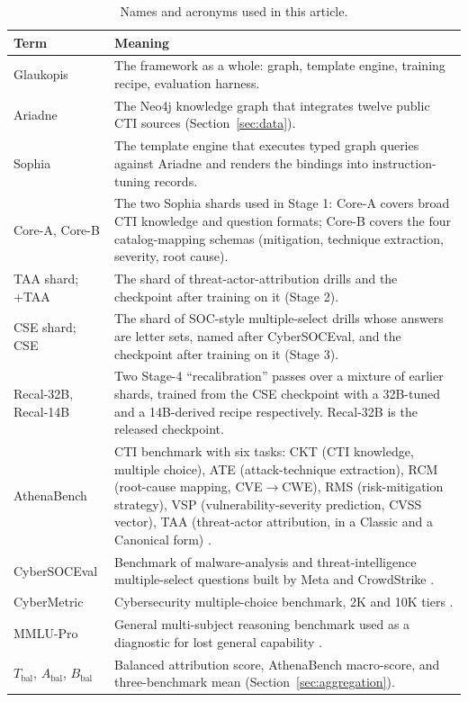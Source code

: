 \documentclass[twocolumn]{svjour3}
\newcommand{\Abal}{A_{\mathrm{bal}}}
\newcommand{\Bbal}{B_{\mathrm{bal}}}
\newcommand{\Tbal}{T_{\mathrm{bal}}}
\begin{document}
\begin{table}
\centering\footnotesize
\caption{Names and acronyms used in this article.}\label{tab:glossary}
\begin{tabularx}{\textwidth}{@{}P{3.2cm}X@{}}
\toprule Term & Meaning \\\midrule
Glaukopis & The framework as a whole: graph, template engine, training recipe, evaluation harness. \\
Ariadne & The Neo4j knowledge graph that integrates twelve public CTI sources (Section~\ref{sec:data}). \\
Sophia & The template engine that executes typed graph queries against Ariadne and renders the bindings into instruction-tuning records. \\
Core-A, Core-B & The two Sophia shards used in Stage 1: Core-A covers broad CTI knowledge and question formats; Core-B covers the four catalog-mapping schemas (mitigation, technique extraction, severity, root cause). \\
TAA shard; +TAA & The shard of threat-actor-attribution drills and the checkpoint after training on it (Stage 2). \\
CSE shard; CSE & The shard of SOC-style multiple-select drills whose answers are letter sets, named after CyberSOCEval, and the checkpoint after training on it (Stage 3). \\
Recal-32B, Recal-14B & Two Stage-4 ``recalibration'' passes over a mixture of earlier shards, trained from the CSE checkpoint with a 32B-tuned and a 14B-derived recipe respectively. Recal-32B is the released checkpoint. \\
AthenaBench & CTI benchmark with six tasks: CKT (CTI knowledge, multiple choice), ATE (attack-technique extraction), RCM (root-cause mapping, CVE$\to$CWE), RMS (risk-mitigation strategy), VSP (vulnerability-severity prediction, CVSS vector), TAA (threat-actor attribution, in a Classic and a Canonical form) \cite{alam2025athenabench}. \\
CyberSOCEval & Benchmark of malware-analysis and threat-intelligence multiple-select questions built by Meta and CrowdStrike \cite{deason2025cybersoceval}. \\
CyberMetric & Cybersecurity multiple-choice benchmark, 2K and 10K tiers \cite{tihanyi2024cybermetric}. \\
MMLU-Pro & General multi-subject reasoning benchmark used as a diagnostic for lost general capability \cite{wang2024mmlupro}. \\
$\Tbal$, $\Abal$, $\Bbal$ & Balanced attribution score, AthenaBench macro-score, and three-benchmark mean (Section~\ref{sec:aggregation}). \\
\bottomrule
\end{tabularx}
\end{table}
\end{document}
